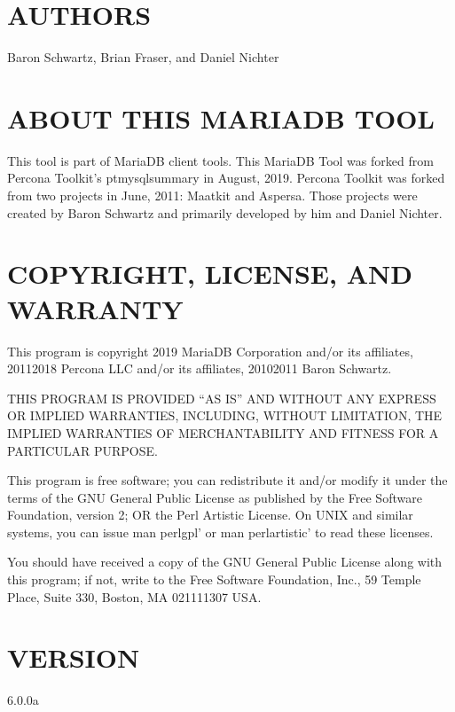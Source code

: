 \documentclass[letterpaper,10pt,english]{sphinxmanual}
\begin{document}
\section{AUTHORS}
\label{\detokenize{mariadb-database-summary:authors}}
\sphinxAtStartPar
Baron Schwartz, Brian Fraser, and Daniel Nichter


\section{ABOUT THIS MARIADB TOOL}
\label{\detokenize{mariadb-database-summary:about-this-mariadb-tool}}
\sphinxAtStartPar
This tool is part of MariaDB client tools. This MariaDB Tool was forked from
Percona Toolkit’s pt\sphinxhyphen{}mysql\sphinxhyphen{}summary in August, 2019. Percona Toolkit was forked
from two projects in June, 2011: Maatkit and Aspersa.  Those projects were
created by Baron Schwartz and primarily developed by him and Daniel Nichter.


\section{COPYRIGHT, LICENSE, AND WARRANTY}
\label{\detokenize{mariadb-database-summary:copyright-license-and-warranty}}
\sphinxAtStartPar
This program is copyright 2019 MariaDB Corporation and/or its affiliates,
2011\sphinxhyphen{}2018 Percona LLC and/or its affiliates, 2010\sphinxhyphen{}2011 Baron Schwartz.

\sphinxAtStartPar
THIS PROGRAM IS PROVIDED “AS IS” AND WITHOUT ANY EXPRESS OR IMPLIED
WARRANTIES, INCLUDING, WITHOUT LIMITATION, THE IMPLIED WARRANTIES OF
MERCHANTABILITY AND FITNESS FOR A PARTICULAR PURPOSE.

\sphinxAtStartPar
This program is free software; you can redistribute it and/or modify it under
the terms of the GNU General Public License as published by the Free Software
Foundation, version 2; OR the Perl Artistic License.  On UNIX and similar
systems, you can issue \textasciigrave{}man perlgpl’ or \textasciigrave{}man perlartistic’ to read these
licenses.

\sphinxAtStartPar
You should have received a copy of the GNU General Public License along with
this program; if not, write to the Free Software Foundation, Inc., 59 Temple
Place, Suite 330, Boston, MA  02111\sphinxhyphen{}1307  USA.


\section{VERSION}
\label{\detokenize{mariadb-database-summary:version}}
\sphinxAtStartPar
{} 6.0.0a
\end{document}
